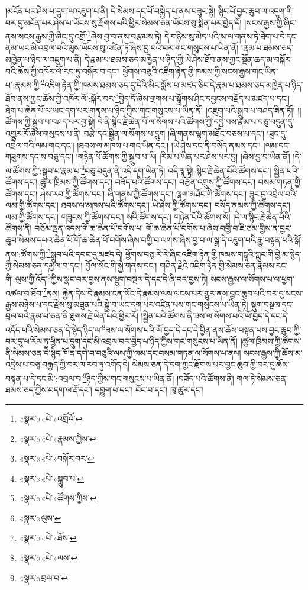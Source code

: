 །མངོན་པར་ཤེས་པ་དྲུག་ལ་འཇུག་པ་ནི། དེ་སེམས་དང་པོ་བསྐྱེད་པ་ནས་བཟུང་སྟེ། སྙིང་པོ་བྱང་ཆུབ་ལ་འདུག་གི་བར་དུ་མངོན་པར་ཤེས་པ་ཡོངས་སུ་རྫོགས་པའི་ཕྱིར་སེམས་ཅན་ཡོངས་སུ་སྨིན་པར་བྱེད་དོ། །སངས་རྒྱས་ཀྱི་ཞིང་ནས་སངས་རྒྱས་ཀྱི་ཞིང་དུ་འགྲོ་\footnote{«སྣར་»«པེ་»འགྲོའོ་}ཞེས་བྱ་བ་ནས་བརྩམས་ཏེ། དེ་གཉིས་སུ་མེད་པའི་ས་ལ་གནས་ཏེ་ཐེག་པ་དེ་དང་ནམ་ཡང་མི་འབྲལ་བའི་ལུས་ཡོངས་སུ་འཛིན་ཏོ་ཞེས་བྱ་བའི་བར་གང་གསུངས་པ་ཡིན་ནོ། །རྣམ་པ་ཐམས་ཅད་མཁྱེན་པ་ཉིད་ལ་འཇུག་པ་ནི། དེ་རྣམ་པ་ཐམས་ཅད་མཁྱེན་པ་ཉིད་ཀྱི་ཡེ་ཤེས་ཐོབ་ནས་ཀྱང་སྔོན་ཆད་མ་བསྐོར་བའི་ཆོས་ཀྱི་འཁོར་ལོ་རབ་ཏུ་བསྐོར་བ་དང་། ཕྱོགས་བཅུའི་འཇིག་རྟེན་གྱི་ཁམས་ཀྱི་སངས་རྒྱས་གང་ཡིན་པ་:རྣམས་ཀྱི་\footnote{«སྣར་»«པེ་»རྣམས་ཀྱིས་}འཇིག་རྟེན་གྱི་ཁམས་ཐམས་ཅད་དུ་དེའི་མིང་སྨོས་པ་མཛད་ཅིང་དེ་རྣམ་པ་ཐམས་ཅད་མཁྱེན་པ་ཉིད་ཐོབ་ནས་ཀྱང་ཆོས་ཀྱི་འཁོར་ལོ་:སྐོར་བར་\footnote{«སྣར་»«པེ་»བསྐོར་བར་}བྱེད་དོ་ཞེས་གྲགས་པ་སྒྲོགས་ཤིང་དབྱངས་བརྗོད་པ་མཛད་པ་དང་། ཐེག་པ་ཆེན་པོ་ལ་ཡང་དག་པར་གནས་པ་ཉིད་ཀྱིས་གང་གསུངས་པ་ཡིན་ནོ། །འཇུག་པའི་སྒྲུབ་པ་བཤད་ཟིན་ཏོ།། །།ཚོགས་ཀྱི་སྒྲུབ་པ་བཤད་པར་བྱ་སྟེ། དེ་ནི་སྙིང་རྗེ་ཆེན་པོ་ལ་སོགས་པའི་ཚོགས་ཀྱི་དབྱེ་བས་རྣམ་པ་བཅུ་བདུན་དུ་འགྱུར་རོ་ཞེས་གསུངས་པ་ནི། བརྩེ་དང་སྦྱིན་ལ་སོགས་པ་དྲུག །ཞི་གནས་ལྷག་མཐོང་བཅས་པ་དང་། །ཟུང་དུ་འབྲེལ་བའི་ལམ་གང་དང་། །ཐབས་ལ་མཁས་པ་གང་ཡིན་དང་། །ཡེ་ཤེས་དང་ནི་བསོད་ནམས་དང་། །ལམ་དང་གཟུགས་དང་ས་བཅུ་དང་། །གཉེན་པོ་ཚོགས་ཀྱི་སྒྲུབ་པ་ཡི། །རིམ་པ་ཡིན་པར་ཤེས་པར་བྱ། །ཞེས་བྱ་བ་ཡིན་ནོ། །དེ་ལ་ཚོགས་ཀྱི་:སྒྲུབ་པ་རྣམ་པ་\footnote{«སྣར་»«པེ་»སྒྲུབ་པ་}བཅུ་བདུན་ནི་འདི་དག་ཡིན་ཏེ། འདི་ལྟ་སྟེ། སྙིང་རྗེ་ཆེན་པོའི་ཚོགས་དང་། སྦྱིན་པའི་ཚོགས་དང་། ཚུལ་ཁྲིམས་ཀྱི་ཚོགས་དང་། བཟོད་པའི་ཚོགས་དང་། བརྩོན་འགྲུས་ཀྱི་ཚོགས་དང་། བསམ་གཏན་གྱི་ཚོགས་དང་། ཤེས་རབ་ཀྱི་ཚོགས་དང་། ཞི་གནས་ཀྱི་ཚོགས་དང་། ལྷག་མཐོང་གི་ཚོགས་དང་། ཟུང་དུ་འབྲེལ་བའི་ལམ་གྱི་ཚོགས་དང་། ཐབས་ལ་མཁས་པའི་ཚོགས་དང་། ཡེ་ཤེས་ཀྱི་ཚོགས་དང་། བསོད་ནམས་ཀྱི་ཚོགས་དང་། ལམ་གྱི་ཚོགས་དང་། གཟུངས་ཀྱི་ཚོགས་དང་། སའི་ཚོགས་དང་། གཉེན་པོའི་ཚོགས་སོ། །དེ་ལ་སྙིང་རྗེ་ཆེན་པོའི་ཚོགས་ནི། བཅོམ་ལྡན་འདས་གོ་ཆ་ཆེན་པོ་བགོས་པ། གོ་ཆ་ཆེན་པོ་བགོས་པ་ཞེས་བགྱི་བ་ཇི་ཙམ་གྱིས་ན་བྱང་ཆུབ་སེམས་དཔའ་ཆེན་པོ་གོ་ཆ་ཆེན་པོ་བགོས་ཞེས་བགྱི་བ་ལགས་ཞེས་བྱ་བ་ལ་སྒྲ་དེ་འཇུག་པའི་རྒྱུ་བསྟན་པའི་སྒོ་ནས་:ཚོགས་ཀྱི་\footnote{«སྣར་»«པེ་»ཚོགས་ཀྱིས་}སྒྲུབ་པའི་དབང་དུ་མཛད་དེ། ཕྱོགས་བཅུ་རེ་རེ་ཞིང་འཇིག་རྟེན་གྱི་ཁམས་གངྒཱའི་ཀླུང་གི་བྱེ་མ་སྙེད་ཀྱི་སེམས་ཅན་དམྱལ་བ་དང་། བྱོལ་སོང་གི་སྐྱེ་གནས་དང་། གཤིན་རྗེའི་འཇིག་རྟེན་གྱི་སེམས་ཅན་རྣམས་རང་གི་:ལུས་ཀྱི་འོད་\footnote{«སྣར་»ལུས་}ཀྱིས་སྣང་བར་བྱས་ནས་སྡུག་བསྔལ་དེ་དང་དེ་ཞི་བར་བྱས་ཏེ། སངས་རྒྱས་ལ་སོགས་པ་ལ་ཕྱག་འཚལ་བ་ཐོབ་\footnote{«སྣར་»«པེ་»ཐོས་}ནས། རྐྱེན་དེས་དེ་རྣམས་ངན་སོང་དེ་རྣམས་ལས་ལངས་པར་གྱུར་ནས་བྱང་ཆུབ་པའི་བར་དུ་སངས་རྒྱས་མཉེས་པ་དང་རྗེས་སུ་མཐུན་པའི་སྐྱེ་བ་ཡང་དག་པར་འཛིན་པས་གང་གསུངས་པ་ཡིན་ཏེ། སྡུག་བསྔལ་དང་བྲལ་བའི་རྣམ་པ་ཅན་ནི་ཐུགས་རྗེ་ཡིན་པའི་ཕྱིར་རོ། །སྦྱིན་པའི་ཚོགས་ནི་ཟས་ལ་སོགས་པའི་ཡོ་བྱད་དེ་དང་དེ་འདོད་པའི་སེམས་ཅན་དེ་སྙེད་ཉིད་ལ་\footnote{«སྣར་»«པེ་»ལས་}ཟས་ལ་སོགས་པའི་ཡོ་བྱད་དེ་དང་དེ་བྱིན་ནས་ཆོས་བསྟན་པས་བྱང་ཆུབ་ཀྱི་བར་དུ་ཕ་རོལ་ཏུ་ཕྱིན་པ་དྲུག་དང་མི་འབྲལ་བར་བྱེད་པ་ཉིད་ཀྱིས་གང་གསུངས་པ་ཡིན་ནོ། །ཚུལ་ཁྲིམས་ཀྱི་ཚོགས་ནི་སེམས་ཅན་དེ་སྙེད་ཁོ་ན་དགེ་བ་བཅུའི་ལས་ཀྱི་ལམ་དང་བསམ་གཏན་ལ་སོགས་པ་ནས། སངས་རྒྱས་ཀྱི་ཆོས་མ་འདྲེས་པ་བཅྭ་བརྒྱད་ཀྱི་བར་ལ་རབ་ཏུ་འགོད་དེ། སེམས་ཅན་དེ་དག་ཀྱང་རྫོགས་པར་བྱང་ཆུབ་ཀྱི་བར་དུ་ཆོས་བསྟན་པ་དེ་དང་མི་:འབྲལ་བ་\footnote{«སྣར་»བྲལ་བ་}ཉིད་ཀྱིས་གང་གསུངས་པ་ཡིན་ནོ། །བཟོད་པའི་ཚོགས་ནི། གལ་ཏེ་སེམས་ཅན་ཐམས་ཅད་ཀྱིས་བདག་ལ་རྡོ་དང་། དབྱུག་པ་དང་། བོང་བ་དང་། ཁུ་ཚུར་དང་། 